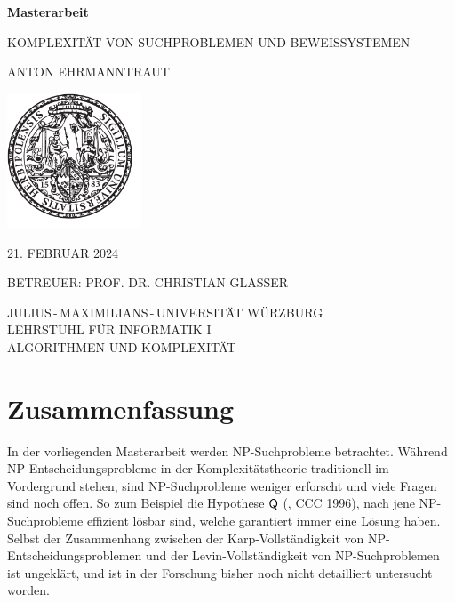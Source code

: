 \pagestyle{empty}

\begin{center}{

\vfill\sffamily

{\Large\textbf{Masterarbeit}}\par
    \vspace*{1cm}
{\huge{KOMPLEXITÄT VON SUCHPROBLEMEN UND BEWEISSYSTEMEN}}\par
    \vspace*{.3cm}
{\Large{ANTON EHRMANNTRAUT}}\par}
\vspace*{6cm}

\includegraphics[width=4cm]{siegel.pdf}

\vspace*{4cm}


\bgroup\sffamily{}
{\large 21. FEBRUAR 2024}\vspace*{.7cm}

{\large BETREUER: PROF. DR. CHRISTIAN GLASSER}\vspace*{.5cm}


{\large
JULIUS\,-\,MAXIMILIANS\,-\,UNIVERSITÄT WÜRZBURG\\
LEHRSTUHL FÜR INFORMATIK I\\
ALGORITHMEN UND KOMPLEXITÄT
}
\egroup


\end{center}

\cleardoublepage
\restoregeometry

\section*{Zusammenfassung}
In der vorliegenden Masterarbeit werden NP-Suchprobleme betrachtet. Während NP-Entscheidungsprobleme in der Komplexitätstheorie traditionell im Vordergrund stehen, sind NP-Suchprobleme weniger erforscht und viele Fragen sind noch offen.
So zum Beispiel die Hypothese $\mathsf{Q}$ (\citeauthor{fenner_inverting_1996}, CCC 1996), nach jene NP-Suchprobleme effizient lösbar sind, welche garantiert immer eine Lösung haben.
Selbst der Zusammenhang zwischen der Karp-Vollständigkeit von NP-Entscheidungsproblemen und der Levin-Vollständigkeit von NP-Suchproblemen ist ungeklärt, und ist in der Forschung bisher noch nicht detailliert untersucht worden.

